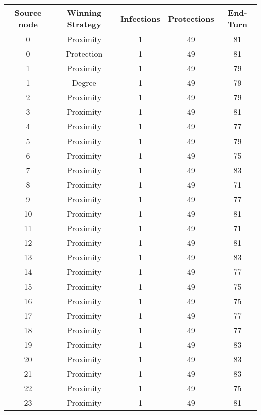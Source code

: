 \documentclass[results.tex]{subfiles}
\begin{document}
\begin{center}
  \begin{tabular}{| c || c | c | c | c |}
    \hline
    {\bfseries Source node} & {\bfseries Winning Strategy} & {\bfseries Infections} & {\bfseries Protections} & {\bfseries End-Turn} \\  %
    \hline\hline
    0 & Proximity & 1 & 49 & 81 \\ 
    \hline
    0 & Protection & 1 & 49 & 81 \\ 
    \hline
    1 & Proximity & 1 & 49 & 79 \\ 
    \hline
    1 & Degree & 1 & 49 & 79 \\ 
    \hline
    2 & Proximity & 1 & 49 & 79 \\ 
    \hline
    3 & Proximity & 1 & 49 & 81 \\ 
    \hline
    4 & Proximity & 1 & 49 & 77 \\ 
    \hline
    5 & Proximity & 1 & 49 & 79 \\ 
    \hline
    6 & Proximity & 1 & 49 & 75 \\ 
    \hline
    7 & Proximity & 1 & 49 & 83 \\ 
    \hline
    8 & Proximity & 1 & 49 & 71 \\ 
    \hline
    9 & Proximity & 1 & 49 & 77 \\ 
    \hline
    10 & Proximity & 1 & 49 & 81 \\ 
    \hline
    11 & Proximity & 1 & 49 & 71 \\ 
    \hline
    12 & Proximity & 1 & 49 & 81 \\ 
    \hline
    13 & Proximity & 1 & 49 & 83 \\ 
    \hline
    14 & Proximity & 1 & 49 & 77 \\ 
    \hline
    15 & Proximity & 1 & 49 & 75 \\ 
    \hline
    16 & Proximity & 1 & 49 & 75 \\ 
    \hline
    17 & Proximity & 1 & 49 & 77 \\ 
    \hline
    18 & Proximity & 1 & 49 & 77 \\ 
    \hline
    19 & Proximity & 1 & 49 & 83 \\ 
    \hline
    20 & Proximity & 1 & 49 & 83 \\ 
    \hline
    21 & Proximity & 1 & 49 & 83 \\ 
    \hline
    22 & Proximity & 1 & 49 & 75 \\ 
    \hline
    23 & Proximity & 1 & 49 & 81 \\ 

\end{tabular}
\end{center}
\end{document}

